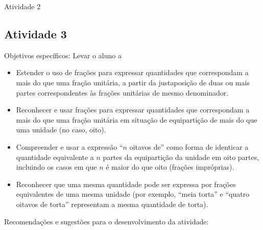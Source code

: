 \documentclass[oneside]{book}
\begin{document}
\begin{multicols}{2}
\begin{resposta*}{Atividade 2}
\end{resposta*}




\subsection{Atividade 3}

  Objetivos específicos: Levar o aluno a
\begin{itemize} %
    \item       Estender o uso de frações para expressar quantidades que correspondam a mais do que uma fração unitária, a partir da justaposição de duas ou mais partes correspondentes às frações unitárias de mesmo denominador.
    \item       Reconhecer e usar frações para expressar quantidades que correspondam a mais do que uma fração unitária em situação de equipartição de mais do que uma unidade (no caso, oito).
    \item       Compreender e usar a expressão       ``$n$ oitavos de''       como forma de identicar a quantidade equivalente a       $n$       partes da equipartição da unidade em oito partes, incluindo os casos em que       $n$       é maior do que oito (frações impróprias).
    \item       Reconhecer que uma mesma quantidade pode ser expressa por frações equivalentes de uma mesma unidade (por exemplo,       ``meia torta''       e       ``quatro oitavos de torta''       representam a mesma quantidade de torta).
\end{itemize} %


  Recomendações e sugestões para o desenvolvimento da atividade:


\end{multicols}
\end{document}
